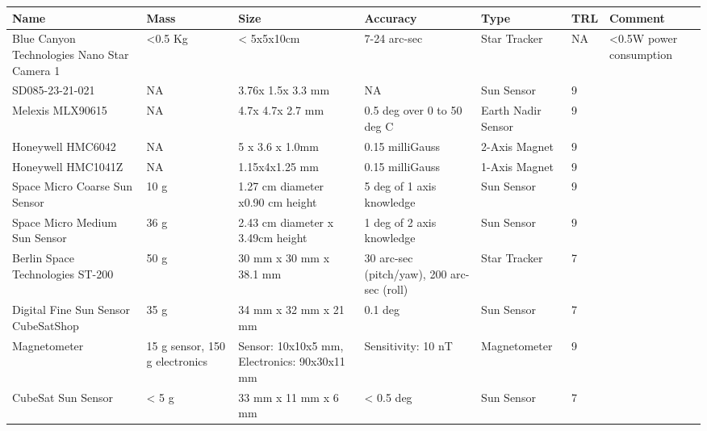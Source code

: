 \documentclass[english]{article}
\begin{document}
\begin{center}
     \begin{tabular}{ | p{2cm} | p{1.25cm} | p{2cm} | l | l | l | p{2cm} |}
     \hline

      {\bf Name} & {\bf Mass} & {\bf Size} & {\bf Accuracy} & {\bf Type} & {\bf TRL} & {\bf Comment}  \\ \hline

     Blue Canyon Technologies Nano Star Camera 1 \cite{BCT} & <0.5 Kg& < 5x5x10cm& 7-24 arc-sec & Star Tracker & NA & <0.5W power consumption \\ \hline

     SD085-23-21-021 \cite{aes2} & NA & 3.76x 1.5x 3.3 mm & NA & Sun Sensor & 9 & \\ \hline

     Melexis MLX90615 \cite{aes3} & NA & 4.7x 4.7x 2.7 mm& 0.5 deg over 0 to 50 deg C & Earth Nadir Sensor & 9 &  \\
     \hline

     Honeywell HMC6042 \cite{aes4} & NA & 5 x 3.6 x 1.0mm & 0.15 milliGauss & 2-Axis Magnet & 9 &   \\ \hline

     Honeywell HMC1041Z \cite{aes5} & NA &1.15x4x1.25 mm & 0.15 milliGauss & 1-Axis Magnet & 9 &   \\ \hline
     
     Space Micro Coarse Sun Sensor \cite{SMI} &  10 g & 1.27 cm diameter x0.90 cm height & 5 deg of 1 axis knowledge & Sun Sensor & 9 & \\ \hline
     
     Space Micro Medium Sun Sensor \cite{SMI} & 36 g &	2.43 cm diameter x 3.49cm height & 1 deg of 2 axis knowledge & Sun Sensor & 9 & \\ \hline
     
	Berlin Space Technologies ST-200 \cite{BST} & 50 g & 30 mm x 30 mm x 38.1 mm & 30 arc-sec (pitch/yaw), 200 arc-sec (roll) & Star Tracker & 7 & \\ \hline

	Digital Fine Sun Sensor CubeSatShop \cite{CubeShop} & 35 g & 34 mm x 32 mm x 21 mm & 0.1 deg & Sun Sensor & 7 & \\ \hline
	
	Magnetometer \cite{CubeShop} & 15 g sensor, 150 g electronics & Sensor: 10x10x5 mm, Electronics: 90x30x11 mm & Sensitivity: 10 nT & Magnetometer & 9 & \\ \hline
	
	CubeSat Sun Sensor \cite{CubeShop} & < 5 g & 33 mm x 11 mm x 6 mm & < 0.5 deg & Sun Sensor & 7 & \\ \hline

     \end{tabular}
\end{center}
\end{document}
